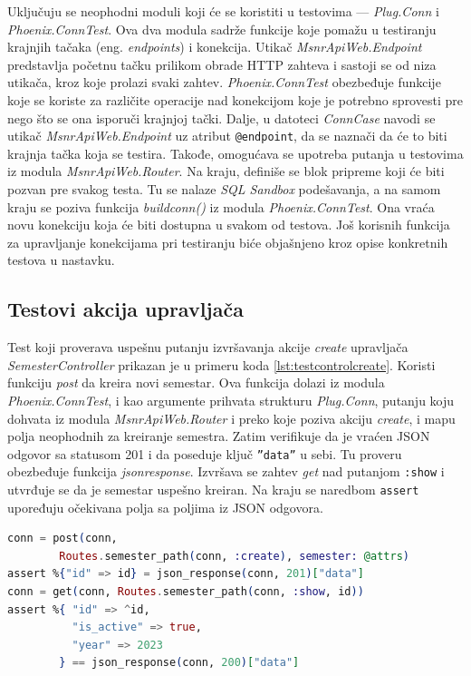 \documentclass[12pt,oneside]{memoir}
\begin{document}
\par Uključuju se neophodni moduli koji će se koristiti u testovima --- \emph{Plug.Conn} i \emph{Phoenix.ConnTest}. Ova dva modula sadrže funkcije koje pomažu u testiranju krajnjih tačaka (eng. \emph{endpoints}) i konekcija. Utikač \emph{MsnrApiWeb.Endpoint} predstavlja početnu tačku prilikom obrade HTTP zahteva i sastoji se od niza utikača, kroz koje prolazi svaki zahtev. \emph{Phoenix.ConnTest} obezbeđuje funkcije koje se koriste za različite operacije nad konekcijom koje je potrebno sprovesti pre nego što se ona isporuči krajnjoj tački. Dalje, u datoteci \emph{ConnCase} navodi se utikač \emph{MsnrApiWeb.Endpoint} uz atribut \texttt{@endpoint}, da se naznači da će to biti krajnja tačka koja se testira. Takođe, omogućava se upotreba putanja u testovima iz modula \emph{MsnrApiWeb.Router}. Na kraju, definiše se blok pripreme koji će biti pozvan pre svakog testa. Tu se nalaze \emph{SQL Sandbox} podešavanja, a na samom kraju se poziva funkcija \emph{build{\textunderscore}conn()} iz modula \emph{Phoenix.ConnTest}. Ona vraća novu konekciju koja će biti dostupna u svakom od testova. Još korisnih funkcija za upravljanje konekcijama pri testiranju biće objašnjeno kroz opise konkretnih testova u nastavku.

\subsection{Testovi akcija upravljača}

\par Test koji proverava uspešnu putanju izvršavanja akcije \emph{create} upravljača \emph{SemesterController} prikazan je u primeru koda \ref{lst:testcontrolcreate}. Koristi funkciju \emph{post} da kreira novi semestar. Ova funkcija dolazi iz modula \emph{Phoenix.ConnTest}, i kao argumente prihvata strukturu \emph{Plug.Conn}, putanju koju dohvata iz modula \emph{MsnrApiWeb.Router} i preko koje poziva akciju \emph{create}, i mapu polja neophodnih za kreiranje semestra. Zatim verifikuje da je vraćen JSON odgovor sa statusom 201 i da poseduje ključ \texttt{''data''} u sebi. Tu proveru obezbeđuje funkcija \emph{json{\textunderscore}response}. Izvršava se zahtev \emph{get} nad putanjom \texttt{:show} i utvrđuje se da je semestar uspešno kreiran. Na kraju se naredbom \texttt{assert} upoređuju očekivana polja sa poljima iz JSON odgovora. \\

\begin{minipage}{\linewidth}
\begin{lstlisting}[language=elixir, basicstyle=\small, caption={Testiranje akcije \emph{create} upravljača \emph{SemesterController}},captionpos=b, label={lst:testcontrolcreate}]
conn = post(conn,
  		Routes.semester_path(conn, :create), semester: @attrs)
assert %{"id" => id} = json_response(conn, 201)["data"]
conn = get(conn, Routes.semester_path(conn, :show, id))
assert %{ "id" => ^id,
          "is_active" => true,
          "year" => 2023 
        } == json_response(conn, 200)["data"]
\end{lstlisting}
\end{minipage}
\end{document}
